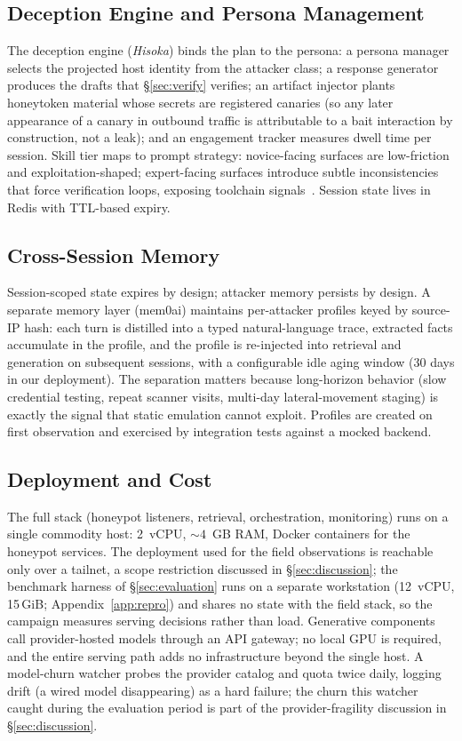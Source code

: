\subsection{Deception Engine and Persona Management}
The deception engine (\emph{Hisoka}) binds the plan to the persona: a
persona manager selects the projected host identity from the attacker
class; a response generator produces the drafts that \S\ref{sec:verify}
verifies; an artifact injector plants honeytoken
material whose secrets are registered canaries (so any later
appearance of a canary in outbound traffic is attributable to a bait
interaction by construction, not a leak); and an engagement tracker measures dwell time per session. Skill tier maps to
prompt strategy: novice-facing surfaces are low-friction and
exploitation-shaped; expert-facing surfaces introduce subtle
inconsistencies that force verification loops, exposing toolchain
signals~\cite{kouremetis2024}. Session state lives in Redis with
TTL-based expiry.

\subsection{Cross-Session Memory}
Session-scoped state expires by design; attacker memory persists by
design. A separate memory layer (mem0ai) maintains per-attacker
profiles keyed by source-IP hash: each turn is distilled into a typed
natural-language trace, extracted facts accumulate in the profile, and
the profile is re-injected into retrieval and generation on subsequent
sessions, with a configurable idle aging window (30 days in our
deployment). The separation matters because long-horizon behavior
(slow credential testing, repeat scanner visits, multi-day
lateral-movement staging) is exactly the signal that static emulation
cannot exploit. Profiles are created on first observation and exercised
by integration tests against a mocked backend.

\subsection{Deployment and Cost}
The full stack (honeypot listeners, retrieval, orchestration, monitoring)
runs on a single commodity host: 2~vCPU, ${\sim}4$~GB RAM, Docker
containers for the honeypot services. The deployment used for the
field observations is reachable only over a tailnet, a scope restriction
discussed in \S\ref{sec:discussion}; the benchmark harness of
\S\ref{sec:evaluation} runs on a separate workstation (12~vCPU,
15\,GiB; Appendix~\ref{app:repro}) and shares no state with the field
stack, so the campaign measures serving decisions rather than load.
Generative components
call provider-hosted models through an API gateway; no local GPU is
required, and the entire serving path adds no infrastructure beyond the
single host. A model-churn watcher probes the provider catalog and quota
twice daily, logging drift (a wired model disappearing) as a hard failure;
the churn this watcher caught during the evaluation period is part of the
provider-fragility discussion in \S\ref{sec:discussion}.

